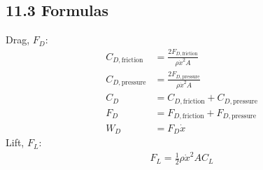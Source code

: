 \subsection*{11.3 Formulas}
Drag, $F_D$:
\begin{align*}
    C_{D, \text{friction}} &= \frac{2 F_{D, \text{friction}}}{\rho \dot{x}^2 A} \\
    C_{D, \text{pressure}} &= \frac{2 F_{D, \text{pressure}}}{\rho \dot{x}^2 A} \\
    C_D &= C_{D, \text{friction}} + C_{D, \text{pressure}} \\
    F_D &= F_{D, \text{friction}} + F_{D, \text{pressure}} \\
    W_{D} &= F_D \dot{x}
\end{align*}
Lift, $F_L$:
\begin{align*}
    F_L = \frac{1}{2} \rho \dot{x}^2 A C_L
\end{align*}

